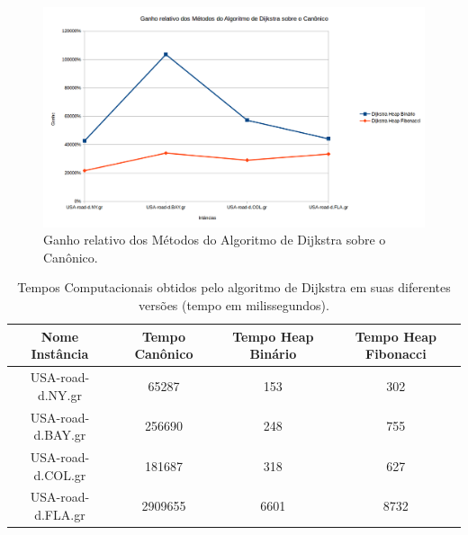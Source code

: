 \begin{figure}[H]
\centering
\includegraphics[width=.90\textwidth]{figuras/speed-up-dijkstra} 
\caption{Ganho relativo dos Métodos do Algoritmo de Dijkstra sobre o Canônico.}
\label{fig-dijkstra-resultados-speedup}
\end{figure}


\begin{table}[H]
\caption{Tempos Computacionais obtidos pelo algoritmo de Dijkstra em suas diferentes versões (tempo em milissegundos).}
\label{tbl-dijkstra-resultados-tempos}
\centering
\begin{adjustbox}{max width=\textwidth}
\begin{tabular}{|c|c|c|c|}
\hline
\textbf{Nome Instância} & \textbf{Tempo Canônico} & \textbf{Tempo Heap Binário} & \textbf{Tempo Heap Fibonacci} \\ \hline
USA-road-d.NY.gr        & 65287                   & 153                         & 302                           \\ \hline
USA-road-d.BAY.gr       & 256690                  & 248                         & 755                           \\ \hline
USA-road-d.COL.gr       & 181687                  & 318                         & 627                           \\ \hline
USA-road-d.FLA.gr       & 2909655                 & 6601                        & 8732                          \\ \hline
\end{tabular}
\end{adjustbox}
\end{table}


